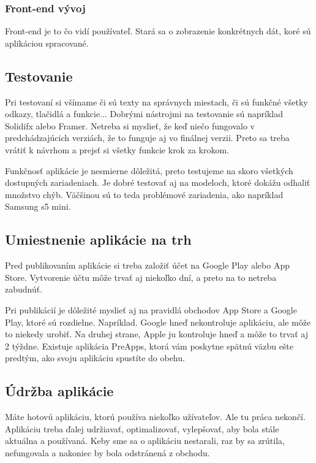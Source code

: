 \documentclass[10pt,twoside,slovak,a4paper]{article}
\begin{document}
\subsubsection{Front-end vývoj}
\quad Front-end je to čo vidí používateľ. Stará sa o zobrazenie konkrétnych dát, koré sú aplikáciou spracované.



\subsection{Testovanie}
\quad Pri testovaní si všímame či sú texty na správnych miestach, či sú funkčné všetky odkazy, tlačidlá a funkcie... Dobrými nástrojmi na testovanie sú napríklad Solidifx alebo Framer. Netreba si myslieť, že keď niečo fungovalo v predchádzajúcich verziách, že to funguje aj vo finálnej verzii. Preto sa treba vrátiť k návrhom a prejsť si všetky funkcie krok za krokom.

Funkčnosť aplikácie je nesmierne dôležitá, preto testujeme na skoro všetkých dostupných zariadeniach. Je dobré testovať aj na modeloch, ktoré dokážu odhaliť množstvo chýb. Väčšinou sú to teda problémové zariadenia, ako napríklad Samsung s5 mini.



\subsection{Umiestnenie aplikácie na trh}
\quad Pred publikovaním aplikácie si treba založiť  účet na Google Play alebo App Store. Vytvorenie účtu môže trvať aj niekoľko dní, a preto na to netreba zabudnúť.

Pri publikácií je dôležité myslieť aj na pravidlá obchodov App Store a Google Play, ktoré sú rozdielne. Napríklad. Google hneď nekontroluje aplikáciu, ale môže to niekedy urobiť. Na druhej strane, Apple ju kontroluje hneď a môže to trvať aj 2 týždne. Existuje aplikácia PreApps, ktorá vám poskytne spätnú väzbu ešte predtým, ako svoju aplikáciu spustíte do obehu.



\subsection{Údržba aplikácie}
\quad Máte hotovú aplikáciu, ktorú používa niekoľko užívateľov. Ale tu práca nekončí. Aplikáciu treba ďalej udržiavať, optimalizovať, vylepšovať, aby bola stále aktuálna a používaná. Keby sme sa o aplikáciu nestarali, raz by sa zrútila, nefungovala a nakoniec by bola odstránená z obchodu.
\end{document}
